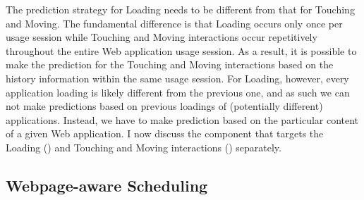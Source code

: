 The prediction strategy for Loading needs to be different from that for Touching and Moving. The fundamental difference is that Loading occurs only once per usage session while Touching and Moving interactions occur repetitively throughout the entire Web application usage session. As a result, it is possible to make the prediction for the Touching and Moving interactions based on the history information within the same usage session. For Loading, however, every application loading is likely different from the previous one, and as such we can not make predictions based on previous loadings of (potentially different) applications. Instead, we have to make prediction based on the particular content of a given Web application. I now discuss the \webrt component that targets the Loading () and Touching and Moving interactions () separately.

\subsection{Webpage-aware Scheduling}
\label{sec:runtime:load}

\begin{table}[t]
\centering
\captionsetup{width=.7\columnwidth}
\renewcommand*{\arraystretch}{1.05}
\renewcommand*{\tabcolsep}{20pt}
\caption{\small Model Predictors}
\label{tab:feat_list}
\end{table}

